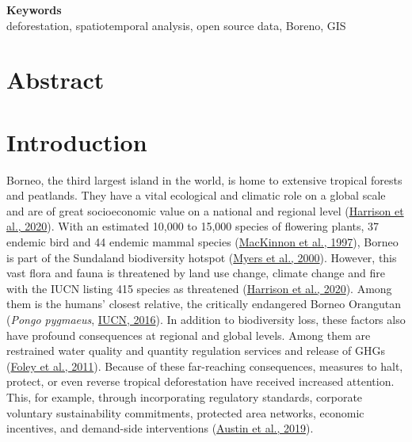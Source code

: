 \documentclass[
  letterpaper,
  DIV=11,
  numbers=noendperiod]{scrreprt}
\begin{document}
\noindent\textbf{Keywords}\\
deforestation, spatiotemporal analysis, open source data, Boreno, GIS

\ifdefined\Shaded\renewenvironment{Shaded}{\begin{tcolorbox}[enhanced, breakable, borderline west={3pt}{0pt}{shadecolor}, interior hidden, frame hidden, sharp corners, boxrule=0pt]}{\end{tcolorbox}}\fi


\hypertarget{abstract}{%
\chapter*{Abstract}\label{abstract}}


\newpage
\tableofcontents


\hypertarget{sec-introduction}{%
\chapter{Introduction}\label{sec-introduction}}

Borneo, the third largest island in the world, is home to extensive
tropical forests and peatlands. They have a vital ecological and
climatic role on a global scale and are of great socioeconomic value on
a national and regional level
(\protect\hyperlink{ref-harrisonTropicalForestPeatland2020}{Harrison et
al., 2020}). With an estimated 10,000 to 15,000 species of flowering
plants, 37 endemic bird and 44 endemic mammal species
(\protect\hyperlink{ref-mackinnonEcologyKalimantan1997}{MacKinnon et
al., 1997}), Borneo is part of the Sundaland biodiversity hotspot
(\protect\hyperlink{ref-myersBiodiversityHotspotsConservation2000}{Myers
et al., 2000}). However, this vast flora and fauna is threatened by land
use change, climate change and fire with the IUCN listing 415 species as
threatened
(\protect\hyperlink{ref-harrisonTropicalForestPeatland2020}{Harrison et
al., 2020}). Among them is the humans' closest relative, the critically
endangered Borneo Orangutan (\emph{Pongo pygmaeus},
\protect\hyperlink{ref-iucnPongoPygmaeusAncrenaz2016}{IUCN, 2016}). In
addition to biodiversity loss, these factors also have profound
consequences at regional and global levels. Among them are restrained
water quality and quantity regulation services and release of GHGs
(\protect\hyperlink{ref-foleySolutionsCultivatedPlanet2011}{Foley et
al., 2011}). Because of these far-reaching consequences, measures to
halt, protect, or even reverse tropical deforestation have received
increased attention. This, for example, through incorporating regulatory
standards, corporate voluntary sustainability commitments, protected
area networks, economic incentives, and demand-side interventions
(\protect\hyperlink{ref-austinWhatCausesDeforestation2019}{Austin et
al., 2019}).
\end{document}
